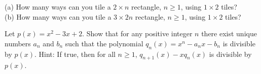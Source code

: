 \documentclass{article}
\begin{document}
 (a) { }How many ways can you tile a \(2 \times  n\) rectangle, \(n\geq 1\), using \(1\times 2\) tiles?\\
\hspace*{0.5ex} (b) How many ways can you tile a \(3 \times  2n\) rectangle, \(n\geq 1\), using \(1\times 2\) tiles?

Let \(p(x)=x^2-3x + 2\). { }Show that for any positive integer \(n\) there exist unique numbers \(a_n\) and \(b_n\) such that the polynomial \(q_n(x)=
x^n-a_nx-b_n\) is divisible by \(p(x)\). { } { }Hint: { }If true, then for all \(n\geq 1\), { } \(q_{n+1}(x)-x q_n(x)\) is divisible by \(p(x)\).
\end{document}
